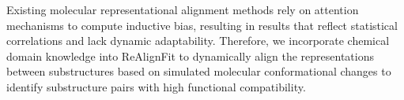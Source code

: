 Existing molecular representational alignment methods rely on attention mechanisms to compute inductive bias, resulting in results that reflect statistical correlations and lack dynamic adaptability. Therefore, we incorporate chemical domain knowledge into ReAlignFit to dynamically align the representations between substructures based on simulated molecular conformational changes to identify substructure pairs with high functional compatibility.
